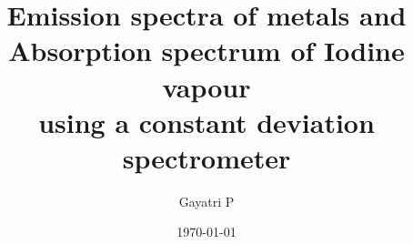 \documentclass[reprint,amsmath,amssymb,aps, margin=1in]{revtex4-2}
\begin{document}
    \title{Emission spectra of metals and Absorption spectrum of Iodine vapour\\using a constant deviation spectrometer}

    \author{Gayatri P}
    \date{\today}

    
    \maketitle

    
    
    
    
    

    
    \nocite{*}
\end{document}
